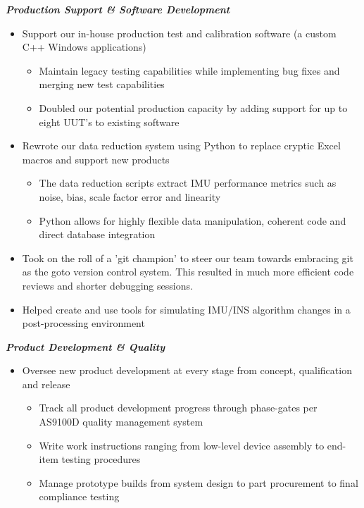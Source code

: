 \documentclass[]{article}
\begin{document}
\begin{singlespace}
\noindent\textbf{\emph{Production Support \& Software Development}}
\vspace{-2mm}
\begin{itemize}
    \setlength\itemsep{0em}
    \item Support our in-house production test and calibration software (a custom C++ Windows applications)
    \vspace{-2mm}
    \begin{itemize}
        \setlength\itemsep{0em}
        \item Maintain legacy testing capabilities while implementing bug fixes and merging new test capabilities
        \item Doubled our potential production capacity by adding support for up to eight UUT's to existing software
    \end{itemize}

    \vspace{-1mm}
    \item Rewrote our data reduction system using Python to replace cryptic Excel macros and support new products 
    \vspace{-2mm}
    \begin{itemize}
        \setlength\itemsep{0em}
        \item The data reduction scripts extract IMU performance metrics such as noise, bias, scale factor error and linearity
        \item Python allows for highly flexible data manipulation, coherent code and direct database integration
    \end{itemize}
    \vspace{-1mm}

    \item Took on the roll of a 'git champion' to steer our team towards embracing git as the goto version control system. This resulted in much more efficient code reviews and shorter debugging sessions.
    \item Helped create and use tools for simulating IMU/INS algorithm changes in a post-processing environment

\end{itemize}

\noindent\textbf{\emph{Product Development \& Quality}}
\vspace{-2mm}
\begin{itemize}
    \setlength\itemsep{0em}
    \item Oversee new product development at every stage from concept, qualification and release
    \vspace{-2mm}
    \begin{itemize}
        \setlength\itemsep{0em}
        \item Track all product development progress through phase-gates per AS9100D quality management system
        \item Write work instructions ranging from low-level device assembly to end-item testing procedures
        \item Manage prototype builds from system design to part procurement to final compliance testing 
    \end{itemize}


\end{itemize}
\end{singlespace}
\end{document}

